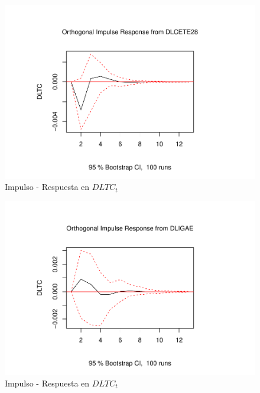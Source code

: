 \documentclass[
]{book}
\begin{document}
\begin{figure}

{\centering \includegraphics{Notas-Series-Tiempo_files/figure-latex/fig64-3} 

}

\caption{Impulso - Respuesta en $DLTC_t$}\label{fig:fig64-3}
\end{figure}
\begin{figure}

{\centering \includegraphics{Notas-Series-Tiempo_files/figure-latex/fig64-4} 

}

\caption{Impulso - Respuesta en $DLTC_t$}\label{fig:fig64-4}
\end{figure}
\end{document}
